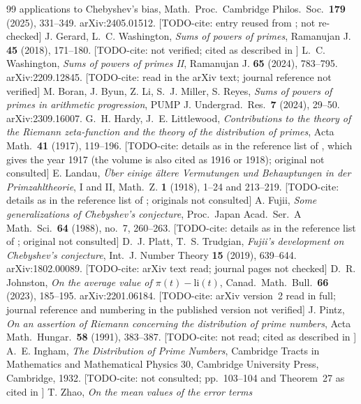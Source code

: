 \documentclass[11pt]{amsart}
\theoremstyle{definition}
\numberwithin{equation}{section}
\newcommand{\todocite}[1]{\textsf{[TODO-cite: #1]}}
\begin{document}
\begin{thebibliography}{99}
{applications to Chebyshev's bias}, Math.\ Proc.\ Cambridge Philos.\
Soc.\ \textbf{179} (2025), 331--349. arXiv:2405.01512.
\todocite{entry reused from \cite{WR}; not re-checked}
 J. Gerard, L.~C. Washington, \emph{Sums of powers of
primes}, Ramanujan J. \textbf{45} (2018), 171--180.
\todocite{not verified; cited as described in \cite{Was24}}
 L.~C. Washington, \emph{Sums of powers of primes II},
Ramanujan J. \textbf{65} (2024), 783--795. arXiv:2209.12845.
\todocite{read in the arXiv text; journal reference not verified}
\bibitem{BBLMR24} M. Boran, J. Byun, Z. Li, S.~J. Miller, S. Reyes,
\emph{Sums of powers of primes in arithmetic progression}, PUMP J.
Undergrad.\ Res.\ \textbf{7} (2024), 29--50. arXiv:2309.16007.
 G.~H. Hardy, J.~E. Littlewood, \emph{Contributions to
the theory of the Riemann zeta-function and the theory of the
distribution of primes}, Acta Math.\ \textbf{41} (1917), 119--196.
\todocite{details as in the reference list of \cite{PT19}, which
gives the year 1917 (the volume is also cited as 1916 or 1918);
original not consulted}
 E. Landau, \emph{\"Uber einige \"altere Vermutungen
und Behauptungen in der Primzahltheorie}, I and II, Math.\ Z.
\textbf{1} (1918), 1--24 and 213--219. \todocite{details as in the
reference list of \cite{PT19}; originals not consulted}
 A. Fujii, \emph{Some generalizations of Chebyshev's
conjecture}, Proc.\ Japan Acad.\ Ser.~A Math.\ Sci.\ \textbf{64}
(1988), no.~7, 260--263. \todocite{details as in the reference list
of \cite{PT19}; original not consulted}
 D.~J. Platt, T.~S. Trudgian, \emph{Fujii's development
on Chebyshev's conjecture}, Int.\ J. Number Theory \textbf{15}
(2019), 639--644. arXiv:1802.00089. \todocite{arXiv text read; journal
pages not checked}
 D.~R. Johnston, \emph{On the average value of
$\pi(t)-\mathrm{li}(t)$}, Canad.\ Math.\ Bull.\ \textbf{66} (2023),
185--195. arXiv:2201.06184. \todocite{arXiv version~2 read in full;
journal reference and numbering in the published version not
verified}
 J. Pintz, \emph{On an assertion of Riemann concerning
the distribution of prime numbers}, Acta Math.\ Hungar.\ \textbf{58}
(1991), 383--387. \todocite{not read; cited as described in
\cite{Joh23}}
 A.~E. Ingham, \emph{The Distribution of Prime
Numbers}, Cambridge Tracts in Mathematics and Mathematical Physics
30, Cambridge University Press, Cambridge, 1932. \todocite{not
consulted; pp.~103--104 and Theorem~27 as cited in \cite{Joh23}}
\bibitem{Zhao25} T. Zhao, \emph{On the mean values of the error terms
}
\end{thebibliography}
\end{document}
